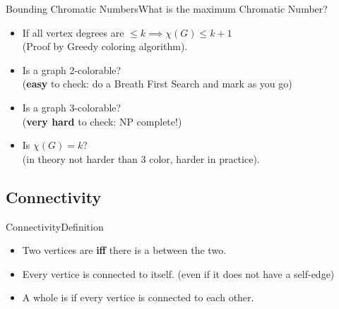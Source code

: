 \begin{frame}{Bounding Chromatic Numbers}{What is the maximum Chromatic Number?}

    \begin{itemize}
    \item If all vertex degrees are $\leq k \implies \chi(G) \leq k+1$\\
      \hfill (Proof by Greedy coloring algorithm).

      \bigskip

    \item Is a graph 2-colorable?\\
      \hfill ({\bf easy} to check: do a Breath First Search and mark as you go)\bigskip

    \item Is a graph 3-colorable?\\
      \hfill ({\bf very hard} to check: NP complete!)\bigskip

    \item Is $\chi(G) = k$?\\
      \hfill (in theory not harder than 3 color, harder in practice).

    \end{itemize}
\end{frame}

\subsection{Connectivity}

\begin{frame}{Connectivity}{Definition}

    \begin{itemize}
    \item Two vertices are  {\bf iff} there is a  between the two.\bigskip

    \item Every vertice is connected to itself. (even if it does not have a self-edge)\bigskip

    \item A whole  is  if every vertice is connected to each other.
    \end{itemize}\bigskip

    \begin{center}
    \end{center}
\end{frame}

